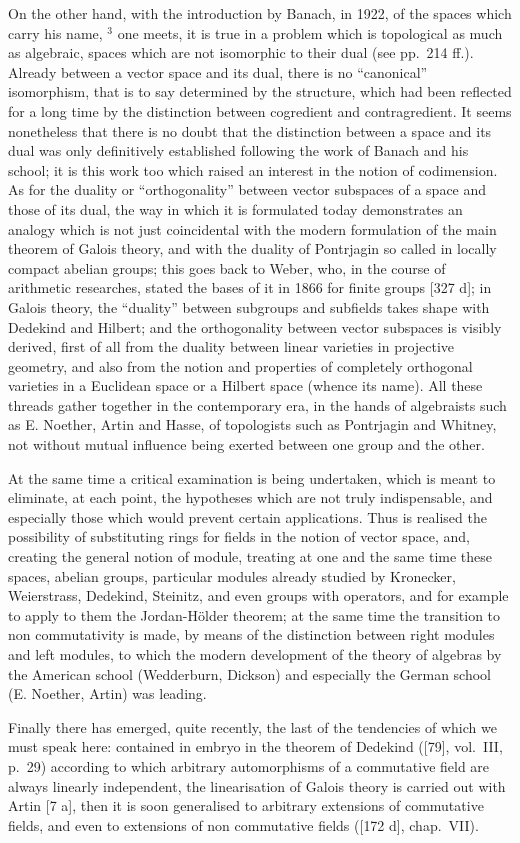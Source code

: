 On the other hand, with the introduction by Banach, in 1922, of the spaces which carry his name, \(^{3}\) one meets, it is true in a problem which is topological as much as algebraic, spaces which are not isomorphic to their dual (see pp.~214 ff.). Already between a vector space and its dual, there is no ``canonical'' isomorphism, that is to say determined by the structure, which had been reflected for a long time by the distinction between cogredient and contragredient. It seems nonetheless that there is no doubt that the distinction between a space and its dual was only definitively established following the work of Banach and his school; it is this work too which raised an interest in the notion of codimension. As for the duality or ``orthogonality'' between vector subspaces of a space and those of its dual, the way in which it is formulated today demonstrates an analogy which is not just coincidental with the modern formulation of the main theorem of Galois theory, and with the duality of Pontrjagin so called in locally compact abelian groups; this goes back to Weber, who, in the course of arithmetic researches, stated the bases of it in 1866 for finite groups {[}327 d{]}; in Galois theory, the ``duality'' between subgroups and subfields takes shape with Dedekind and Hilbert; and the orthogonality between vector subspaces is visibly derived, first of all from the duality between linear varieties in projective geometry, and also from the notion and properties of completely orthogonal varieties in a Euclidean space or a Hilbert space (whence its name). All these threads gather together in the contemporary era, in the hands of algebraists such as E. Noether, Artin and Hasse, of topologists such as Pontrjagin and Whitney, not without mutual influence being exerted between one group and the other.

At the same time a critical examination is being undertaken, which is meant to eliminate, at each point, the hypotheses which are not truly indispensable, and especially those which would prevent certain applications. Thus is realised the possibility of substituting rings for fields in the notion of vector space, and, creating the general notion of module, treating at one and the same time these spaces, abelian groups, particular modules already studied by Kronecker, Weierstrass, Dedekind, Steinitz, and even groups with operators, and for example to apply to them the Jordan-Hölder theorem; at the same time the transition to non commutativity is made, by means of the distinction between right modules and left modules, to which the modern development of the theory of algebras by the American school (Wedderburn, Dickson) and especially the German school (E. Noether, Artin) was leading.

Finally there has emerged, quite recently, the last of the tendencies of which we must speak here: contained in embryo in the theorem of Dedekind ({[}79{]}, vol.~III, p.~29) according to which arbitrary automorphisms of a commutative field are always linearly independent, the linearisation of Galois theory is carried out with Artin {[}7 a{]}, then it is soon generalised to arbitrary extensions of commutative fields, and even to extensions of non commutative fields ({[}172 d{]}, chap.~VII).

